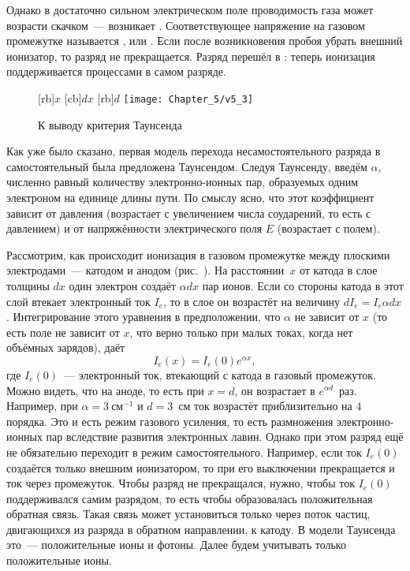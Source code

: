 Однако в достаточно сильном электрическом поле проводимость газа может возрасти скачком~--- возникает .
Соответствующее напряжение на газовом промежутке называется , или .
Если после возникновения пробоя убрать внешний ионизатор, то разряд не прекращается. Разряд перешёл в : теперь ионизация поддерживается процессами в самом разряде.

\begin{figure}[h!]
	\centering
	[rb]{$x$}
	[cb]{$dx$}
	[rb]{$d$}
	\texttt{[image: Chapter\_5/v5\_3]}
	\caption{К выводу критерия Таунсенда}
\end{figure}


Как уже было сказано, первая модель перехода несамостоятельного разряда в самостоятельный была предложена Таунсендом.
Следуя Таунсенду, введём  $\alpha$, численно равный количеству электронно-ионных
пар, образуемых одним электроном на единице длины пути. По смыслу ясно, что этот коэффициент зависит от давления
(возрастает с увеличением числа соударений, то есть с давлением) и от напряжённости электрического поля $E$ (возрастает
с полем).

Рассмотрим, как происходит ионизация в газовом промежутке между плоскими электродами~--- катодом и анодом (рис.~). На
расстоянии~$x$ от катода в слое толщины $dx$ один электрон создаёт $\alpha dx$ пар ионов. Если со стороны катода в этот
слой втекает электронный ток $I_e$, то в слое он возрастёт на величину $dI_e=I_e\alpha dx$. Интегрирование этого
уравнения в предположении, что $\alpha$ не зависит от $x$ (то есть поле не зависит от $x$, что верно только при малых
токах, когда нет объёмных зарядов), даёт
\begin{equation*}
	I_e(x)=I_e(0)e^{\alpha x},
\end{equation*}
где $I_e(0)$~--- электронный ток, втекающий с катода в газовый промежуток. Можно видеть, что на аноде, то есть
при $x=d$, он возрастает в $e^{\alpha d}$~раз. Например, при $\alpha=3~\text{см}^{-1}$ и $d=3$~см ток возрастёт приблизительно
на 4 порядка. Это и есть режим газового усиления, то есть размножения электронно-ионных пар вследствие развития
электронных лавин. Однако при этом разряд ещё не обязательно переходит в режим самостоятельного. Например, если ток
$I_e(0)$ создаётся только внешним ионизатором, то при его выключении прекращается и ток через промежуток. Чтобы разряд
не прекращался, нужно, чтобы ток $I_e(0)$ поддерживался самим разрядом, то есть чтобы образовалась положительная
обратная связь. Такая связь может установиться только через поток частиц, двигающихся из разряда в обратном направлении,
к катоду. В модели Таунсенда это~--- положительные ионы и фотоны. Далее будем учитывать только положительные ионы.

